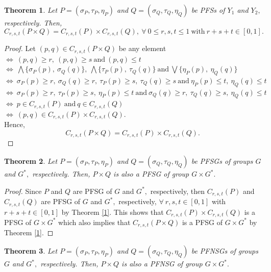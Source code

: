 \documentclass[12pt,letterpaper]{amsart}
\theoremstyle{plain}
\newtheorem{theorem}{Theorem}[section]
\theoremstyle{definition}
\numberwithin{equation}{section}
\begin{document}
\begin{theorem}
Let $P = (\sigma_P, \tau_P, \eta_P)$ and $Q = (\sigma_Q, \tau_Q, \eta_Q)$ be PFSs of $Y_1$ and $Y_2,$ respectively. Then, $$C_{r, s, t} (P \times Q) = C_{r, s, t} (P) \times C_{r, s, t} (Q),~\forall~ 0 \leq r, s, t \leq 1~\text{with}~r + s + t \in [0, 1].$$ 
\end{theorem}

\begin{proof}
Let $(p, q) \in C_{r, s, t} (P \times Q)$ be any element\\ 
$\iff~(p, q) \geq r,~(p, q) \geq s~\text{and}~(p, q) \leq t $\\ $\iff~\bigwedge \{\sigma_P(p),~\sigma_Q(q)\},~\bigwedge \{\tau_P(p),~\tau_Q(q)\}~\text{and}~\bigvee \{\eta_P(p),~\eta_Q(q)\} $\\ $\iff~\sigma_P(p) \geq r,~\sigma_Q(q) \geq r,~\tau_P(p) \geq s,~\tau_Q(q) \geq s~\text{and}~\eta_P(p) \leq t,~\eta_Q(q) \leq t$\\ $\iff~\sigma_P(p) \geq r,~ \tau_P(p) \geq s,~\eta_P(p) \leq t~ \text{and}~ \sigma_Q(q) \geq r,~ \tau_Q(q) \geq s,~\eta_Q(q) \leq t$\\ $\iff~p \in C_{r, s, t} (P)~ \text{and}~ q \in C_{r, s, t} (Q)$\\ $\iff~ (p, q) \in C_{r, s, t} (P) \times C_{r, s, t} (Q).$\\ Hence, $$C_{r, s, t} (P \times Q) = C_{r, s, t} (P) \times C_{r, s, t} (Q).$$ 
\end{proof}

\begin{theorem}
Let $P = (\sigma_P, \tau_P, \eta_P)$ and $Q = (\sigma_Q, \tau_Q, \eta_Q)$ be PFSGs of groups $G$ and $G^{*},$ respectively. Then, $P \times Q$ is also a PFSG of group $G \times G^{*}.$
\end{theorem}

\begin{proof}
Since $P$ and $Q$ are PFSG of $G$ and $G^{*},$ respectively, then $C_{r, s, t} (P)$ and $C_{r, s, t} (Q)$ are PFSG of $G$ and $G^{*},$ respectively, $\forall~r , s, t \in [0, 1]$ with $r + s + t \in [0, 1]$ by Theorem \ref{1}. This shows that $C_{r, s, t} (P) \times C_{r, s, t} (Q)$ is a PFSG of $G \times G^{*}$ which also implies that $C_{r, s, t} (P \times Q)$ is a PFSG of $G \times G^{*}$ by Theorem \ref{1}.    
\end{proof}

\begin{theorem} \label{a}
Let $P = (\sigma_P, \tau_P, \eta_P)$ and $Q = (\sigma_Q, \tau_Q, \eta_Q)$ be PFNSGs of groups $G$ and $G^{*},$ respectively. Then, $P \times Q$ is also a PFNSG of group $G \times G^{*}.$
\end{theorem}
\end{document}
